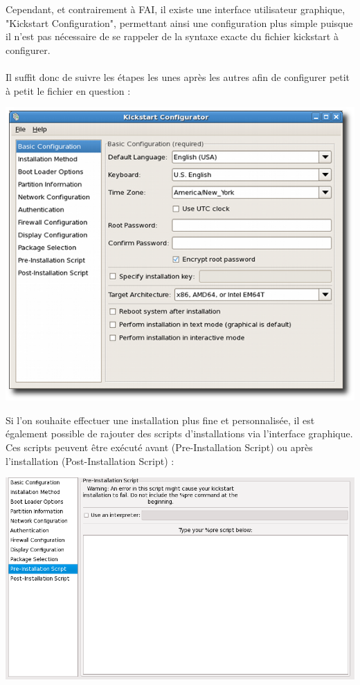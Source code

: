 \documentclass[a4paper,12pt,one side,titlepage]{report}
\begin{document}
Cependant, et contrairement à FAI, il existe une interface utilisateur graphique, "Kickstart Configuration", permettant ainsi une configuration plus simple puisque il n'est pas nécessaire de se rappeler de la syntaxe exacte du fichier kickstart à configurer.\\\\
Il suffit donc de suivre les étapes les unes après les autres afin de configurer petit à petit le fichier en question :\\
\begin{center}\includegraphics[scale=0.5]{./img/kickstart.png}\end{center}
\vspace{1em}
Si l'on souhaite effectuer une installation plus fine et personnalisée, il est également possible de rajouter des scripts d'installations via l'interface graphique.
Ces scripts peuvent être exécuté avant (Pre-Installation Script) ou après l'installation (Post-Installation Script) :
\begin{center}\includegraphics[scale=0.5]{./img/kickstart2.png}\end{center}
\end{document}
